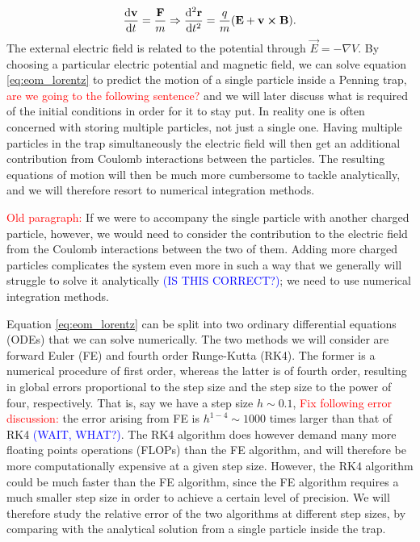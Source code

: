 \begin{equation}\label{eq:eom_lorentz}
 \dv{\mathbf{v}}{t} = \frac{\mathbf{F}}{m}  \Rightarrow \dv[2]{\mathbf{r}}{t}= \frac{q}{m} (\mathbf{E} + \mathbf{v} \cross \mathbf{B} ).
\end{equation}
The external electric field is related to the potential through $\vec{E} = -\nabla V$. By choosing a particular electric potential and magnetic field, we can solve equation \eqref{eq:eom_lorentz} to predict the motion of a single particle inside a Penning trap, \textcolor{red}{are we going to the following sentence?} and we will later discuss what is required of the initial conditions in order for it to stay put. In reality one is often concerned with storing multiple particles, not just a single one. Having multiple particles in the trap simultaneously the electric field will then get an additional contribution from Coulomb interactions between the particles. The resulting equations of motion will then be much more cumbersome to tackle analytically, and we will therefore resort to numerical integration methods. 

\textcolor{red}{Old paragraph:}
If we were to accompany the single particle with another charged particle, however, we would need to consider the contribution to the electric field from the Coulomb interactions between the two of them. Adding more charged particles complicates the system even more in such a way that we generally will struggle to solve it analytically \textcolor{blue}{(IS THIS CORRECT?)}; we need to use numerical integration methods. 


Equation \eqref{eq:eom_lorentz} can be split into two ordinary differential equations (ODEs) that we can solve numerically. The two methods we will consider are forward Euler (FE) and fourth order Runge-Kutta (RK4). The former is a numerical procedure of first order, whereas the latter is of fourth order, resulting in global errors proportional to the step size and the step size to the power of four, respectively. That is, say we have a step size $h\sim 0.1$, \textcolor{red}{Fix following error discussion:} the error arising from FE is $h^{1-4} \sim 1000$ times larger than that of RK4 \textcolor{blue}{(WAIT, WHAT?)}. The RK4 algorithm does however demand many more floating points operations (FLOPs) than the FE algorithm, and will therefore be more computationally expensive at a given step size. However, the RK4 algorithm could be much faster than the FE algorithm, since the FE algorithm requires a much smaller step size in order to achieve a certain level of precision. We will therefore study the relative error of the two algorithms at different step sizes, by comparing with the analytical solution from a single particle inside the trap.          


